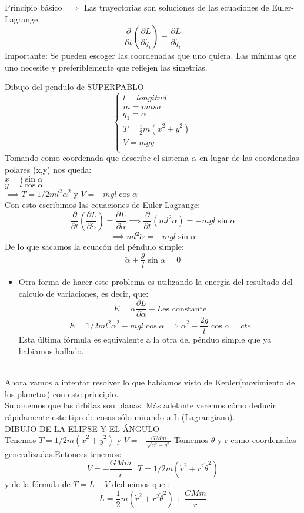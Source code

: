 Principio básico $\implies$ Las trayectorias son soluciones de las ecuaciones de Euler-Lagrange. $$\frac{\partial}{\partial t}\left(\frac{\partial L}{\partial\dot{q_i}}\right) = \frac{\partial L}{\partial \dot{q_i}}$$
Importante: Se pueden escoger las coordenadas que uno quiera. Las mínimas que uno necesite y preferiblemente que reflejen las simetrías.
\begin{example}
Dibujo del pendulo de SUPERPABLO
	$$\begin{cases}
		l= longitud\\
		m=masa\\
		q_1=\alpha\\
		T = \frac{1}{2} m (\dot x^2 + \dot y^2)\\
		V=mgy\\
	\end{cases}$$
	Tomando como coordenada que describe el sistema $\alpha$ en lugar de las coordenadas polares (x,y) nos queda:\\
	$x=l\sin\alpha$\\
	$y=l\cos\alpha$\\
	$\implies T = 1/2 m l^2 \dot\alpha^2 \text{ y } V = -m g l \cos\alpha$\\
	Con esto escribimos las ecuaciones de Euler-Lagrange:\\
	$$\frac{\partial}{\partial t}\left(\frac{\partial L}{\partial \dot\alpha}\right) = \frac{\partial L}{\partial\alpha} \implies \frac{\partial}{\partial t}(m l^2 \dot\alpha) = -m g l\sin\alpha$$
	$$\implies ml^2\ddot\alpha = -m g l \sin\alpha$$
	De lo que sacamos la ecuacón del péndulo simple:
	$$\ddot\alpha + \frac{g}{l} \sin\alpha = 0$$
	\begin{itemize}
	\item Otra forma de hacer este problema es utilizando la energía del resultado del calculo de variaciones, es decir, que:
	$$E = \dot\alpha \frac{\partial L}{\partial\dot\alpha} - L \text{es constante}$$
	$$E = 1/2 m l^2\dot\alpha^2 - mgl\cos\alpha \implies \dot\alpha^2 - \frac{2g}{l}\cos\alpha = cte$$
	Esta última fórmula es equivalente a la otra del pénduo simple que ya habiamos hallado.
	\end{itemize}
\end{example}

\begin{example}\\
Ahora vamos a intentar resolver lo que habiamos visto de Kepler(movimiento de los planetas) con este principio.\\
Suponemos que las órbitas son planas. Más adelante veremos cómo deducir rápidamente este tipo de cosas sólo mirando a L (Lagrangiano).\\
DIBUJO DE LA ELIPSE Y EL ÁNGULO\\
Tenemos $T = 1/2 m(\dot x^2 + \dot y^2)$ y $V = -\frac{GMm}{\sqrt{x^2 + y^2}}$
Tomemos $\theta$ y r como coordenadas generalizadas.Entonces tenemos:\\
$$V= -\frac{GMm}{r}\text{     } T= 1/2 m (\dot r^2 + r^2 \dot\theta^2)$$
y de la fórmula de $T= L-V$ deducimos que :
$$L = \frac{1}{2} m (\dot r^2 + r^2 \dot\theta^2) + \frac{GMm}{r}$$
\end{example}

	


